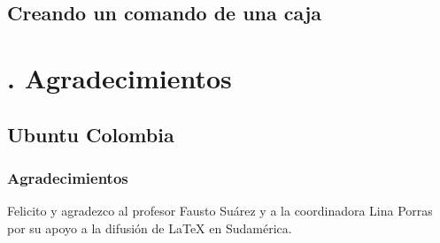 \documentclass[12pt]{beamer}
\begin{document}
\subsection{Creando un comando de una caja}

\section{\thesection. Agradecimientos}
\subsection{Ubuntu Colombia}

\begin{frame}
\frametitle{Agradecimientos}
\Large
Felicito y agradezco al profesor Fausto Suárez y a la coordinadora Lina Porras por su apoyo a la difusión de \LaTeX{} en Sudamérica.
\end{frame}
\end{document}
